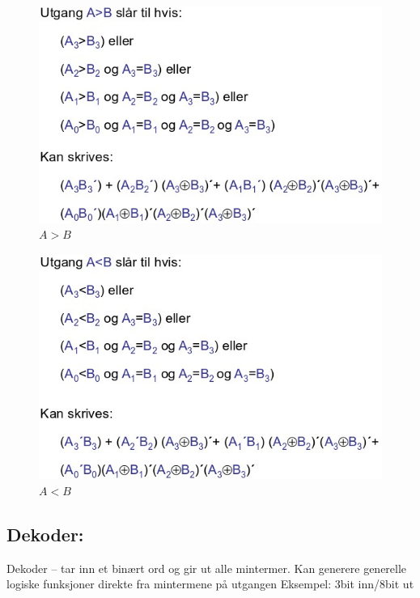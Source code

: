 \documentclass{article}
\begin{document}
	
	\begin{figure}[H]
		\includegraphics[scale = 0.6]{komp2.jpg}
		\caption{$A>B$}
	\end{figure}
	
	\begin{figure}[H]
		\includegraphics[scale = 0.6]{komp3.jpg}
		\caption{$A<B$}
	\end{figure}
	
	\subsection{Dekoder:}
	 Dekoder – tar inn et binært ord og gir ut alle mintermer. 
	 Kan generere generelle logiske funksjoner direkte fra mintermene på utgangen 
	 Eksempel: 3bit inn/8bit ut 
	 
\end{document}
